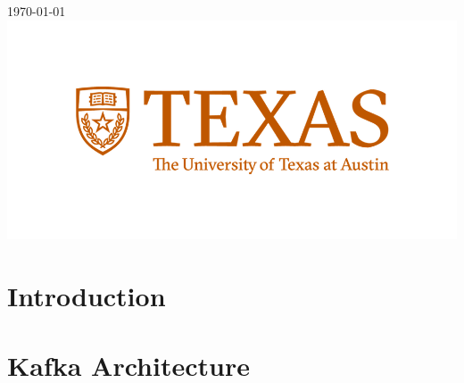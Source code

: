 \begin{titlepage}


{\large \today}\\[2cm] %


\includegraphics{logo.png}\\[1cm] %
 

\vfill %

\end{titlepage}


\begin{abstract}
\end{abstract}

\section{Introduction}

\section{Kafka Architecture}

